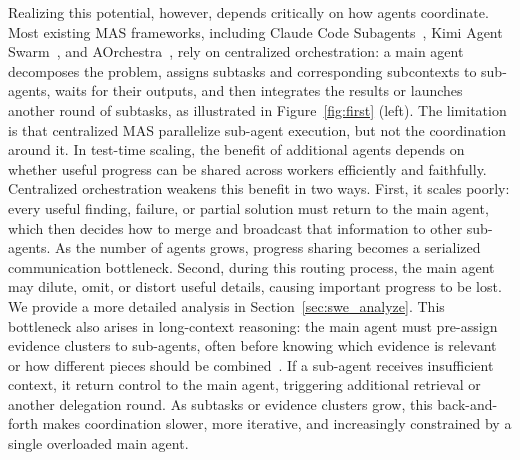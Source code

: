 Realizing this potential, however, depends critically on how agents coordinate. Most existing MAS frameworks, including Claude Code Subagents~\citep{anthropic_claude_code_2026}, Kimi Agent Swarm~\citep{team2026kimi}, and AOrchestra~\citep{ruan2026aorchestra}, rely on centralized orchestration: a main agent decomposes the problem, assigns subtasks and corresponding subcontexts to sub-agents, waits for their outputs, and then integrates the results or launches another round of subtasks, as illustrated in Figure~\ref{fig:first} (left). 
The limitation is that centralized MAS parallelize sub-agent execution, but not the coordination around it.
In test-time scaling, the benefit of additional agents depends on whether useful progress can be shared across workers efficiently and faithfully. Centralized orchestration weakens this benefit in two ways. First, it scales poorly: every useful finding, failure, or partial solution must return to the main agent, which then decides how to merge and broadcast that information to other sub-agents. As the number of agents grows, progress sharing becomes a serialized communication bottleneck. Second, during this routing process, the main agent may dilute, omit, or distort useful details, causing important progress to be lost. We provide a more detailed analysis in Section~\ref{sec:swe_analyze}. This bottleneck also arises in long-context reasoning: the main agent must pre-assign evidence clusters to sub-agents, often before knowing which evidence is relevant or how different pieces should be combined~\citep{anthropic_claude_code_2026, zhang2025recursive}. If a sub-agent receives insufficient context, it return control to the main agent, triggering additional retrieval or another delegation round. As subtasks or evidence clusters grow, this back-and-forth makes coordination slower, more iterative, and increasingly constrained by a single overloaded main agent.


